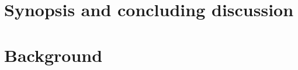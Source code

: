 



\maketitle%

\tableofcontents{}

\setcounter{chapter}{-1}
\chapter{Synopsis and concluding discussion}
\clearpage

\clearpage



\chapter{Background}\label{chapter:stringdiagrams}
\label{sec:proctheory}
\clearpage

\clearpage








